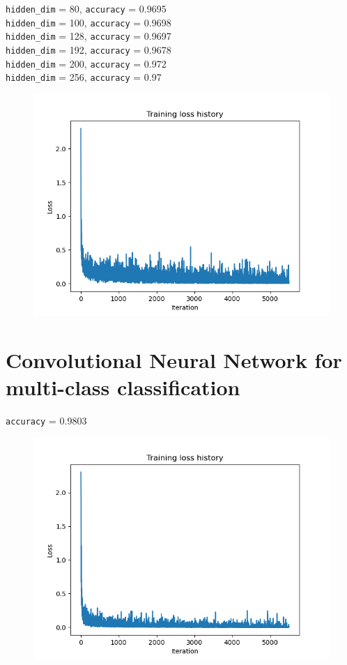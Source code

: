 \documentclass{article}
\begin{document}
\texttt{hidden\_dim} = 80, \texttt{accuracy} = 0.9695 \\
\texttt{hidden\_dim} = 100, \texttt{accuracy} = 0.9698 \\
\texttt{hidden\_dim} = 128, \texttt{accuracy} = 0.9697 \\
\texttt{hidden\_dim} = 192, \texttt{accuracy} = 0.9678 \\
\texttt{hidden\_dim} = 200, \texttt{accuracy} = 0.972 \\
\texttt{hidden\_dim} = 256, \texttt{accuracy} = 0.97
\begin{figure}[htbp]
    \centering
    \includegraphics[width=.7\textwidth]{softmax_loss.png}
\end{figure}

\newpage

\section{Convolutional Neural Network for multi-class classification}

\texttt{accuracy} = 0.9803
\begin{figure}[htbp]
    \centering
    \includegraphics[width=.7\textwidth]{cnn_loss.png}
\end{figure}
\end{document}
